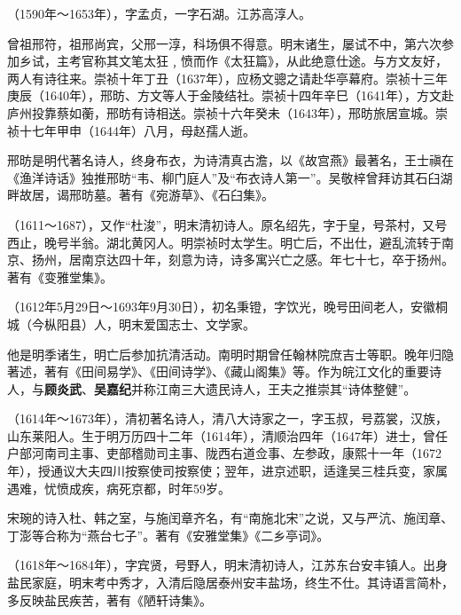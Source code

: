 \begin{description}[
  before={\setcounter{myterm}{0}}, %
  font={\stepcounter{myterm}\arabic{myterm}.~\bfseries}, %
  labelsep=0.5em,
  leftmargin=3em %
]
  \item [\hypertarget{XingFang}{邢昉}] （1590年～1653年），字孟贞，一字石湖。江苏高淳人。\par
        曾祖邢符，祖邢尚宾，父邢一淳，科场俱不得意。明末诸生，屡试不中，第六次参加乡试，主考官称其文笔太狂﹐愤而作《太狂篇》，从此绝意仕途。与方文友好，两人有诗往来。崇祯十年丁丑（1637年），应杨文骢之请赴华亭幕府。崇祯十三年庚辰（1640年），邢昉、方文等人于金陵结社。崇祯十四年辛巳（1641年），方文赴庐州投靠蔡如蘅，邢昉有诗相送。崇祯十六年癸未（1643年），邢昉旅居宣城。崇祯十七年甲申（1644年）八月，母赵孺人逝。\par
        邢昉是明代著名诗人，终身布衣，为诗清真古澹，以《故宫燕》最著名，王士禛在《渔洋诗话》独推邢昉“韦、柳门庭人”及“布衣诗人第一”。吴敬梓曾拜访其石臼湖畔故居，谒邢昉墓。著有《宛游草》、《石臼集》。
  \item[杜濬]  （1611～1687），又作“杜浚”，明末清初诗人。原名绍先，字于皇，号茶村，又号西止，晚号半翁。湖北黄冈人。明崇祯时太学生。明亡后，不出仕，避乱流转于南京、扬州，居南京达四十年，刻意为诗，诗多寓兴亡之感。年七十七，卒于扬州。著有《变雅堂集》。
  \item[钱澄之] （1612年5月29日～1693年9月30日），初名秉镫，字饮光，晚号田间老人，安徽桐城（今枞阳县）人，明末爱国志士、文学家。\par
        他是明季诸生，明亡后参加抗清活动。南明时期曾任翰林院庶吉士等职。晚年归隐著述，著有《田间易学》、《田间诗学》、《藏山阁集》等。作为皖江文化的重要诗人，与\textbf{顾炎武}、\textbf{吴嘉纪}并称江南三大遗民诗人，王夫之推崇其“诗体整健”。
  \item[宋琬] （1614年～1673年），清初著名诗人，清八大诗家之一，字玉叔，号荔裳，汉族，山东莱阳人。生于明万历四十二年（1614年），清顺治四年（1647年）进士，曾任户部河南司主事、吏部稽勋司主事、陇西右道佥事、左参政，康熙十一年（1672年），授通议大夫四川按察使司按察使；翌年，进京述职，适逢吴三桂兵变，家属遇难，忧愤成疾，病死京都，时年59岁。\par
        宋琬的诗入杜、韩之室，与施闰章齐名，有“南施北宋”之说，又与严沆、施闰章、丁澎等合称为“燕台七子”。著有《安雅堂集》《二乡亭词》。
  \item[吴嘉纪] （1618年～1684年），字宾贤，号野人，明末清初诗人，江苏东台安丰镇人。出身盐民家庭，明末考中秀才，入清后隐居泰州安丰盐场，终生不仕。其诗语言简朴，多反映盐民疾苦，著有《陋轩诗集》。\par

\end{description}
